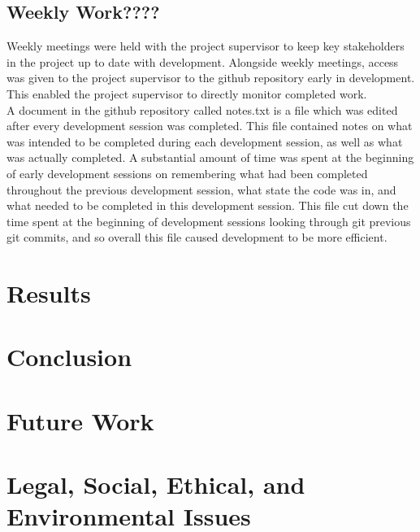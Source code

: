 \documentclass{article}
\begin{document}
\subsection{Weekly Work????}

Weekly meetings were held with the project supervisor to keep key stakeholders in the project up to date with development. Alongside weekly meetings, access was given to the project supervisor to the  github repository early in development. This enabled the project supervisor to directly monitor completed work. \\

A document in the github repository called notes.txt is a file which was edited after every development session was completed. This file contained notes on what was intended to be completed during each development session, as well as what was actually completed. A substantial amount of time was spent at the beginning of early development sessions on remembering what had been completed throughout the previous development session, what state the code was in, and what needed to be completed in this development session. This file cut down the time spent at the beginning of development sessions looking through git previous git commits, and so overall this file caused development to be more efficient. \\




\section{Results}

\section{Conclusion}

\section{Future Work}

\section{Legal, Social, Ethical, and Environmental Issues}
\end{document}
